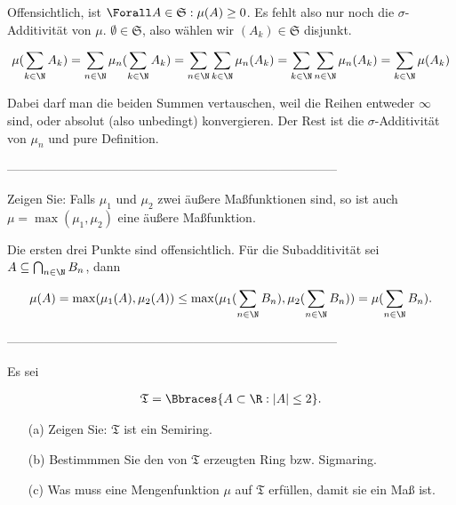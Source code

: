 \begin{solution}

Offensichtlich, ist $\Forall A \in \mathfrak{S}: \mu(A) \geq 0$. Es fehlt also nur noch die $\sigma$-Additivität von $\mu$. $\emptyset \in \mathfrak{S}$, also wählen wir $(A_k) \in \mathfrak{S}$ disjunkt.

\begin{align*}
  \mu(\sum_{k \in \N} A_k)
  =
  \sum_{n \in \N} \mu_n(\sum_{k \in \N} A_k)
  =
  \sum_{n \in \N} \sum_{k \in \N} \mu_n(A_k)
  =
  \sum_{k \in \N} \sum_{n \in \N} \mu_n(A_k)
  =
  \sum_{k \in \N} \mu(A_k)
\end{align*}

Dabei darf man die beiden Summen vertauschen, weil die Reihen entweder $\infty$ sind, oder absolut (also unbedingt) konvergieren. Der Rest ist die $\sigma$-Additivität von $\mu_n$ und pure Definition.

\end{solution}

--------------------------------------------------------------------------------

\begin{exercise}

Zeigen Sie: Falls $\mu_1$ und $\mu_2$ zwei äußere Maßfunktionen sind, so ist auch $\mu = \max(\mu_1, \mu_2)$ eine äußere Maßfunktion.

\end{exercise}

\begin{solution}

Die ersten drei Punkte sind offensichtlich. Für die Subadditivität sei $A \subseteq \bigcap_{n \in \N} B_n$, dann

\begin{align*}
  \mu(A)
  =
  \max(\mu_1(A), \mu_2(A))
  \leq
  \max(\mu_1(\sum_{n \in \N} B_n), \mu_2(\sum_{n \in \N} B_n))
  =
  \mu(\sum_{n \in \N} B_n).
\end{align*}

\end{solution}

--------------------------------------------------------------------------------

\begin{exercise}

Es sei

\begin{align*}
  \mathfrak{T} = \Bbraces{A \subset \R: |A| \leq 2}.
\end{align*}

\begin{itemize}
  \item[(a)] Zeigen Sie: $\mathfrak{T}$ ist ein Semiring.
  \item[(b)] Bestimmmen Sie den von $\mathfrak{T}$ erzeugten Ring bzw. Sigmaring.
  \item[(c)] Was muss eine Mengenfunktion $\mu$ auf $\mathfrak{T}$ erfüllen, damit sie ein Maß ist.
\end{itemize}

\end{exercise}

